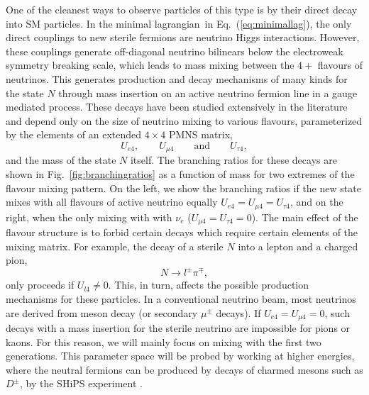\documentclass[11pt, a4paper]{article}
\newcommand{\refeq}[1]{Eq.~(\ref{#1})}
\newcommand{\reffig}[1]{Fig.~\ref{#1}}
\def\lagrangian{lagrangian}
\begin{document}
One of the cleanest ways to observe particles of this type is by their direct
decay into SM particles. In the minimal \lagrangian\ in \refeq{eq:minimallag},
the only direct couplings to new sterile fermions are neutrino Higgs
interactions. However, these couplings generate off-diagonal neutrino bilinears
below the electroweak symmetry breaking scale, which leads to mass mixing
between the $4+$ flavours of neutrinos. This generates production and decay
mechanisms of many kinds for the state $N$ through mass insertion on an active
neutrino fermion line in a gauge mediated process. These decays have been
studied extensively in the literature \cite{Atre:2009rg} and depend only on the
size of neutrino mixing to various flavours, parameterized by the elements of
an extended $4\times4$ PMNS matrix,
%
\[ U_{e4}, \qquad U_{\mu 4} \qquad \text{and} \qquad U_{\tau 4},  \]
%
and the mass of the state $N$ itself. The branching ratios for these decays are
shown in \reffig{fig:branchingratios} as a function of mass for two extremes of
the flavour mixing pattern. On the left, we show the branching ratios if the
new state mixes with all flavours of active neutrino equally $U_{e4}=U_{\mu
4}=U_{\tau 4}$, and on the right, when the only mixing with with $\nu_e$
($U_{\mu 4}=U_{\tau 4} = 0$). The main effect of the flavour structure is to
forbid certain decays which require certain elements of the mixing matrix. For
example, the decay of a sterile $N$ into a lepton and a charged pion,
%
\[ N \to l^\pm \pi^\mp,   \]
%
only proceeds if $U_{l4}\neq 0$. This, in turn, affects the possible production
mechanisms for these particles. In a conventional neutrino beam, most neutrinos
are derived from meson decay (or secondary $\mu^\pm$ decays). If $U_{e4}=U_{\mu
4}=0$, such decays with a mass insertion for the sterile neutrino are
impossible for pions or kaons. For this reason, we will mainly focus on mixing
with the first two generations. This parameter space will be probed by working
at higher energies, where the neutral fermions can be produced by decays of
charmed mesons such as $D^\pm$, by the SHiPS experiment \cite{Alekhin:2015byh}.
 
\end{document}
